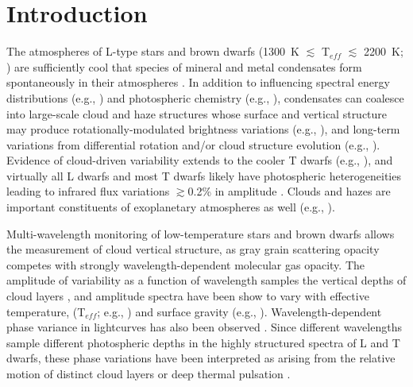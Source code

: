 \documentclass[twocolumn]{aastex6}
\newcommand{\teff}{T$_{eff}$}
\begin{document}



\section{Introduction}

The atmospheres of L-type stars and brown dwarfs (1300~K $\lesssim$ {\teff} $\lesssim$ 2200~K; \citealt{2015ApJ...810..158F}) are sufficiently cool that species of mineral and metal condensates form spontaneously in their atmospheres \citep{1996A&A...305L...1T,2010ApJ...716.1060V}.
In addition to influencing spectral energy distributions (e.g., \citealt{2001ApJ...556..357A,2008ApJ...674..451B}) and photospheric chemistry (e.g., \citealt{2000ApJ...531..438B}), condensates can coalesce into large-scale cloud and haze structures \citep{1989ApJ...338..314L,2001ApJ...556..872A,2014Natur.505..654C}
whose surface and vertical structure may produce rotationally-modulated brightness variations (e.g., \citealt{2012ApJ...750..105R}), and long-term variations from differential rotation and/or cloud structure evolution (e.g., \citealt{2009ApJ...701.1534A,2013A&A...555L...5G,2016ApJ...826....8Y}). Evidence of cloud-driven variability extends to the cooler T dwarfs (e.g., \citealt{2009ApJ...701.1534A,2012ApJ...760L..31B,2015ApJ...799..154M}), and virtually all L dwarfs and most T dwarfs likely have photospheric heterogeneities leading to infrared flux variations $\gtrsim$0.2\% in amplitude \citep{2015ApJ...799..154M}. Clouds and hazes are important constituents of exoplanetary atmospheres as well (e.g., \citealt{2011ApJ...733...65B,2014Natur.505...69K,2016Natur.529...59S}).

Multi-wavelength monitoring of low-temperature stars and brown dwarfs allows the measurement of cloud vertical structure, as gray grain scattering opacity competes with strongly wavelength-dependent molecular gas opacity. The amplitude of variability as a function of wavelength samples the vertical depths of cloud layers \citep{2013ApJ...768..121A}, and amplitude spectra have been show to vary with effective temperature, ({\teff}; e.g., \citealt{2015ApJ...798L..13Y}) and surface gravity (e.g., \citealt{2016ApJ...829L..32L}). Wavelength-dependent phase variance in lightcurves has also been observed \citep{2012ApJ...760L..31B,2013ApJ...778L..10B,2016ApJ...826....8Y}. Since different wavelengths sample different photospheric depths in the highly structured spectra of L and T dwarfs, these phase variations have been interpreted as arising from the relative motion of distinct cloud layers or deep thermal pulsation \citep{2014ApJ...785..158R}. 
\end{document}
